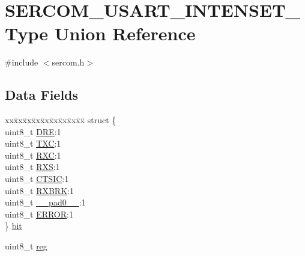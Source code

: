 \hypertarget{union_s_e_r_c_o_m___u_s_a_r_t___i_n_t_e_n_s_e_t___type}{}\section{S\+E\+R\+C\+O\+M\+\_\+\+U\+S\+A\+R\+T\+\_\+\+I\+N\+T\+E\+N\+S\+E\+T\+\_\+\+Type Union Reference}
\label{union_s_e_r_c_o_m___u_s_a_r_t___i_n_t_e_n_s_e_t___type}


{\ttfamily \#include $<$sercom.\+h$>$}

\subsection*{Data Fields}
\begin{DoxyCompactItemize}
\item 
\begin{tabbing}
xx\=xx\=xx\=xx\=xx\=xx\=xx\=xx\=xx\=\kill
struct \{\\
\>uint8\_t \mbox{\hyperlink{union_s_e_r_c_o_m___u_s_a_r_t___i_n_t_e_n_s_e_t___type_a5e4bea925be1d5304d58110ecc60f14e}{DRE}}:1\\
\>uint8\_t \mbox{\hyperlink{union_s_e_r_c_o_m___u_s_a_r_t___i_n_t_e_n_s_e_t___type_a8f012b40a2f5cf52b14d448b314b5cec}{TXC}}:1\\
\>uint8\_t \mbox{\hyperlink{union_s_e_r_c_o_m___u_s_a_r_t___i_n_t_e_n_s_e_t___type_ad465929f0a73cbdc2d5ab6b210909039}{RXC}}:1\\
\>uint8\_t \mbox{\hyperlink{union_s_e_r_c_o_m___u_s_a_r_t___i_n_t_e_n_s_e_t___type_ab54b6e9387289f3bbffba2ad5b5fd646}{RXS}}:1\\
\>uint8\_t \mbox{\hyperlink{union_s_e_r_c_o_m___u_s_a_r_t___i_n_t_e_n_s_e_t___type_a63fbe80d72a96677df0d6251a87c413a}{CTSIC}}:1\\
\>uint8\_t \mbox{\hyperlink{union_s_e_r_c_o_m___u_s_a_r_t___i_n_t_e_n_s_e_t___type_a12194247ef8f371df5b8b093552a5a0c}{RXBRK}}:1\\
\>uint8\_t \mbox{\hyperlink{union_s_e_r_c_o_m___u_s_a_r_t___i_n_t_e_n_s_e_t___type_a8b4eebe79ded0459acec2f4950102ba3}{\_\_pad0\_\_}}:1\\
\>uint8\_t \mbox{\hyperlink{union_s_e_r_c_o_m___u_s_a_r_t___i_n_t_e_n_s_e_t___type_a4be51829c8720b7d159b77c39924afaa}{ERROR}}:1\\
\} \mbox{\hyperlink{union_s_e_r_c_o_m___u_s_a_r_t___i_n_t_e_n_s_e_t___type_acb1b6f931e4bc1ef84473e8adea12f6c}{bit}}\\

\end{tabbing}\item 
uint8\+\_\+t \mbox{\hyperlink{union_s_e_r_c_o_m___u_s_a_r_t___i_n_t_e_n_s_e_t___type_a9428adc9af4653a2050e2536b55dec8d}{reg}}
\end{DoxyCompactItemize}


